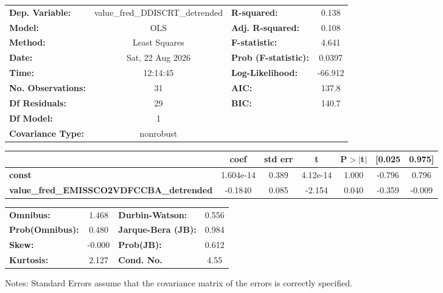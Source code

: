 \begin{center}
\begin{tabular}{lclc}
\toprule
\textbf{Dep. Variable:}                          & value\_fred\_DDISCRT\_detrended & \textbf{  R-squared:         } &     0.138   \\
\textbf{Model:}                                  &               OLS               & \textbf{  Adj. R-squared:    } &     0.108   \\
\textbf{Method:}                                 &          Least Squares          & \textbf{  F-statistic:       } &     4.641   \\
\textbf{Date:}                                   &         Sat, 22 Aug 2026        & \textbf{  Prob (F-statistic):} &   0.0397    \\
\textbf{Time:}                                   &             12:14:45            & \textbf{  Log-Likelihood:    } &   -66.912   \\
\textbf{No. Observations:}                       &                  31             & \textbf{  AIC:               } &     137.8   \\
\textbf{Df Residuals:}                           &                  29             & \textbf{  BIC:               } &     140.7   \\
\textbf{Df Model:}                               &                   1             & \textbf{                     } &             \\
\textbf{Covariance Type:}                        &            nonrobust            & \textbf{                     } &             \\
\bottomrule
\end{tabular}
\begin{tabular}{lcccccc}
                                                 & \textbf{coef} & \textbf{std err} & \textbf{t} & \textbf{P$> |$t$|$} & \textbf{[0.025} & \textbf{0.975]}  \\
\midrule
\textbf{const}                                   &    1.604e-14  &        0.389     &  4.12e-14  &         1.000        &       -0.796    &        0.796     \\
\textbf{value\_fred\_EMISSCO2VDFCCBA\_detrended} &      -0.1840  &        0.085     &    -2.154  &         0.040        &       -0.359    &       -0.009     \\
\bottomrule
\end{tabular}
\begin{tabular}{lclc}
\textbf{Omnibus:}       &  1.468 & \textbf{  Durbin-Watson:     } &    0.556  \\
\textbf{Prob(Omnibus):} &  0.480 & \textbf{  Jarque-Bera (JB):  } &    0.984  \\
\textbf{Skew:}          & -0.000 & \textbf{  Prob(JB):          } &    0.612  \\
\textbf{Kurtosis:}      &  2.127 & \textbf{  Cond. No.          } &     4.55  \\
\bottomrule
\end{tabular}
\end{center}

Notes: \newline
 [1] Standard Errors assume that the covariance matrix of the errors is correctly specified.